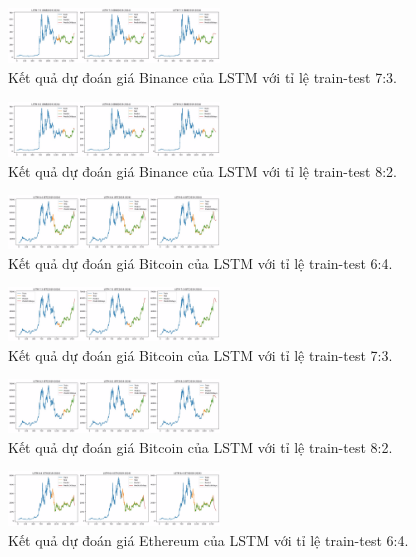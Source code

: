 \documentclass{ieeeojies}
\begin{document}
\begin{figure}[h]
    \centering
    \includegraphics[width=0.5\textwidth]{bibliography/pictures/LSTM 73 BNB.jpg}
    \caption{Kết quả dự đoán giá Binance của LSTM với tỉ lệ train-test 7:3.}
\end{figure}
\begin{figure}[h]
    \centering
    \includegraphics[width=0.5\textwidth]{bibliography/pictures/LSTM 82 BNB.jpg}
    \caption{Kết quả dự đoán giá Binance của LSTM với tỉ lệ train-test 8:2.}
\end{figure}
\begin{figure}[h]
    \centering
    \includegraphics[width=0.5\textwidth]{bibliography/pictures/LSTM 64 BTC.jpg}
    \caption{Kết quả dự đoán giá Bitcoin của LSTM với tỉ lệ train-test 6:4.}
\end{figure}
\begin{figure}[h]
    \centering
    \includegraphics[width=0.5\textwidth]{bibliography/pictures/LSTM 73 BTC.jpg}
    \caption{Kết quả dự đoán giá Bitcoin của LSTM với tỉ lệ train-test 7:3.}
\end{figure}
\begin{figure}[h]
    \centering
    \includegraphics[width=0.5\textwidth]{bibliography/pictures/LSTM 82 BTC.jpg}
    \caption{Kết quả dự đoán giá Bitcoin của LSTM với tỉ lệ train-test 8:2.}
\end{figure}
\begin{figure}[h]
    \centering
    \includegraphics[width=0.5\textwidth]{bibliography/pictures/LSTM 64 ETH.jpg}
    \caption{Kết quả dự đoán giá Ethereum của LSTM với tỉ lệ train-test 6:4.}
\end{figure}
\end{document}
